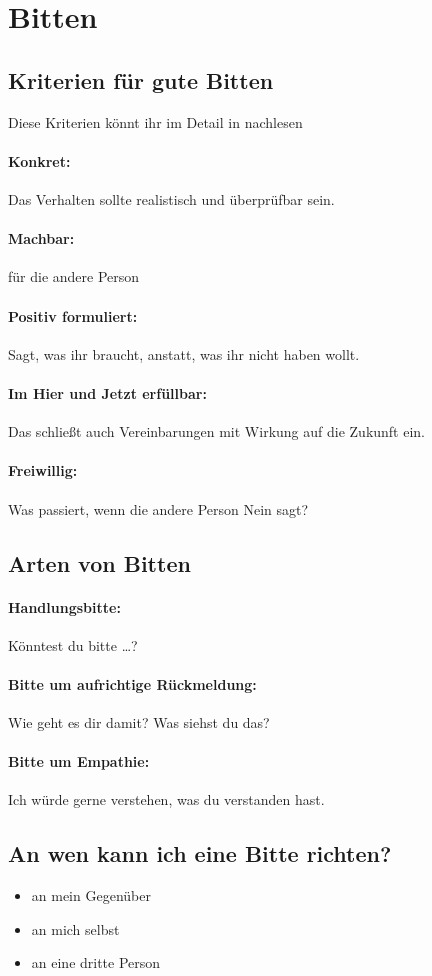 \section{Bitten}
\label{bitten}

\subsection{Kriterien für gute Bitten}

Diese Kriterien könnt ihr im Detail in \cite[S. 85f]{gfk-dummies} nachlesen

\paragraph{Konkret:} Das Verhalten sollte realistisch und überprüfbar sein.

\paragraph{Machbar:} für die andere Person

\paragraph{Positiv formuliert:} Sagt, was ihr braucht, anstatt, was ihr nicht haben wollt.

\paragraph{Im Hier und Jetzt erfüllbar:} Das schließt auch Vereinbarungen mit Wirkung auf die Zukunft ein.

\paragraph{Freiwillig:} Was passiert, wenn die andere Person Nein sagt?


\subsection{Arten von Bitten}

\paragraph{Handlungsbitte:} Könntest du bitte …?

\paragraph{Bitte um aufrichtige Rückmeldung:} Wie geht es dir damit? Was siehst du das?

\paragraph{Bitte um Empathie:} Ich würde gerne verstehen, was du verstanden hast.


\subsection{An wen kann ich eine Bitte richten?}

\begin{itemize}
  \item an mein Gegenüber
  \item an mich selbst
  \item an eine dritte Person
\end{itemize}

